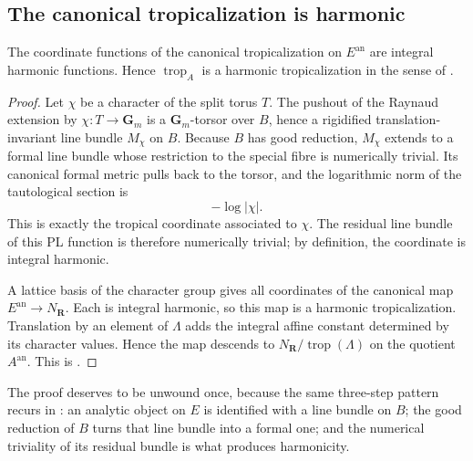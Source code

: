 \subsection{The canonical tropicalization is harmonic}
\label{sec:ch19-abelian-harmonic}

\begin{theorem}\label{thm:abelian-harmonic-tropicalization}
The coordinate functions of the canonical tropicalization on
$E^{\mathrm{an}}$ are integral harmonic functions.  Hence
$\operatorname{trop}_A$ is a harmonic tropicalization in the sense of
.
\end{theorem}
\begin{proof}
Let $\chi$ be a character of the split torus $T$.  The pushout of the
Raynaud extension by $\chi:T\to\mathbf G_m$ is a
$\mathbf G_m$-torsor over $B$, hence a rigidified translation-invariant line
bundle $M_\chi$ on $B$.  Because $B$ has good reduction, $M_\chi$ extends to
a formal line bundle whose restriction to the special fibre is numerically
trivial.  Its canonical formal metric pulls back to the torsor, and the
logarithmic norm of the tautological section is
\[
                         -\log|\chi|.
\]
This is exactly the tropical coordinate associated to $\chi$.  The residual
line bundle of this PL function is therefore numerically trivial; by
definition, the coordinate is integral harmonic.

A lattice basis of the character group gives all coordinates of the
canonical map $E^{\mathrm{an}}\to N_{\mathbf R}$.  Each is integral harmonic,
so this map is a harmonic tropicalization.  Translation by an element of
$\Lambda$ adds the integral affine constant determined by its character
values.  Hence the map descends to
$N_{\mathbf R}/\operatorname{trop}(\Lambda)$ on the quotient
$A^{\mathrm{an}}$.  This is \cite[Proposition~16.2]{GJR26}.
\end{proof}

The proof deserves to be unwound once, because the same three-step pattern
recurs in : an analytic object on $E$ is
identified with a line bundle on $B$; the good reduction of $B$ turns
that line bundle into a formal one; and the numerical triviality of its
residual bundle is what produces harmonicity.

